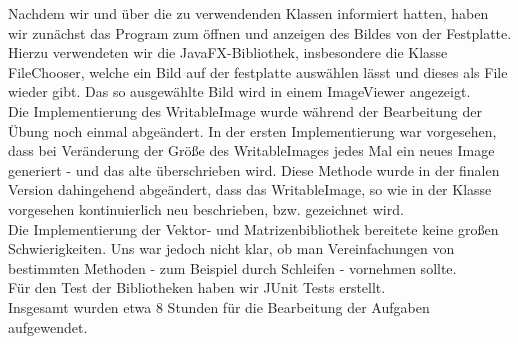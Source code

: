 \documentclass[a4paper, 10pt]{scrartcl}
\begin{document}
Nachdem wir und über die zu verwendenden Klassen informiert hatten, haben wir zunächst das Program zum öffnen und anzeigen des Bildes von der Festplatte.\\
Hierzu verwendeten wir die JavaFX-Bibliothek, insbesondere die Klasse FileChooser, welche ein Bild auf der festplatte auswählen lässt und dieses als File wieder gibt. Das so ausgewählte Bild wird in einem ImageViewer angezeigt.\\
\newline
Die Implementierung des WritableImage wurde während der Bearbeitung der Übung noch einmal abgeändert. In der ersten Implementierung war vorgesehen, dass bei Veränderung der Größe des WritableImages jedes Mal ein neues Image generiert - und das alte überschrieben wird. Diese Methode wurde in der finalen Version dahingehend abgeändert, dass das WritableImage, so wie in der Klasse vorgesehen kontinuierlich neu beschrieben, bzw. gezeichnet wird.\\
\newline
Die Implementierung der Vektor- und Matrizenbibliothek bereitete keine großen Schwierigkeiten. Uns war jedoch nicht klar, ob man Vereinfachungen von bestimmten Methoden - zum Beispiel durch Schleifen - vornehmen sollte.\\
Für den Test der Bibliotheken haben wir JUnit Tests erstellt.\\
\newline
Insgesamt wurden etwa 8 Stunden für die Bearbeitung der Aufgaben aufgewendet.
\end{document}
